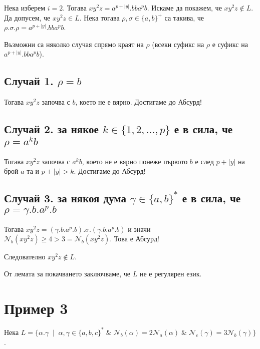 \documentclass[12pt]{article}
\begin{document}
\vspace*{3mm}

\par Нека изберем \(i = 2\). Тогава \(xy^2z = a^{p + |y|}.bba^pb\). Искаме да покажем, че \(xy^2z \notin L\).
Да допусем, че \(xy^2z \in L\).
Нека тогава \(\rho, \sigma \in \{a, b\}^+\) са такива, че \(\rho.\sigma.\rho = a^{p + |y|}.bba^pb\).

Възможни са няколко случая спрямо краят на \(\rho\) (всеки суфикс на \(\rho\) е суфикс на \(a^{p + |y|}.bba^pb\)).

\subsection{Случай 1. \(\rho = b\)}
Тогава \(xy^2z\) започва с \(b\), което не е вярно. Достигаме до Абсурд!

\subsection{Случай 2. за някое \(k \in \{1, 2, \dots, p\}\) е в сила, че \(\rho = a^kb\)}
Тогава \(xy^2z\) започва с \(a^kb\), което не е вярно понеже първото \(b\) е след \(p + |y|\) на брой \(a\)-та и \(p + |y| > k\).
Достигаме до Абсурд!

\subsection{Случай 3. за някоя дума \(\gamma \in \{a, b\}^*\) е в сила, че \(\rho = \gamma.b.a^p.b\)}
Тогава \(xy^2z = (\gamma.b.a^p.b).\sigma.(\gamma.b.a^p.b)\) и значи \(\mathcal{N}_b(xy^2z) \geq 4 > 3 = \mathcal{N}_b(xy^2z)\).
Това е Абсурд!

\vspace*{5mm}

\par Следователно \(xy^2z \notin L\).

\vspace*{4mm}

\par От лемата за покачването заключваме, че \(L\) не е регулярен език.

\section{Пример 3}
Нека \(L = \{\alpha.\gamma \;\mid\; \alpha, \gamma \in \{a, b, c\}^* \;\&\; \mathcal{N}_b(\alpha) = 2\mathcal{N}_a(\alpha) \;\&\; \mathcal{N}_c(\gamma) = 3\mathcal{N}_b(\gamma)\}\).
\end{document}
